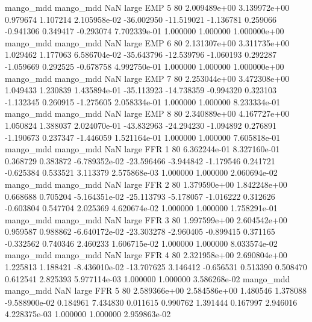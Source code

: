 mango_mdd mango_mdd                   NaN      large      EMP                 5 80 2.009489e+00   3.139972e+00      0.979674       1.107214  2.105958e-02    -36.002950    -11.519021    -1.136781       0.259066 -0.941306   0.349417    -0.293074   7.702339e-01            1.000000        1.000000        1.000000e+00
mango_mdd mango_mdd                   NaN      large      EMP                 6 80 2.131307e+00   3.311735e+00      1.029462       1.177063  6.586704e-02    -35.643796    -12.539796    -1.060193       0.292287 -1.059669   0.292525    -0.678758   4.992750e-01            1.000000        1.000000        1.000000e+00
mango_mdd mango_mdd                   NaN      large      EMP                 7 80 2.253044e+00   3.472308e+00      1.049433       1.230839  1.435894e-01    -35.113923    -14.738359    -0.994320       0.323103 -1.132345   0.260915    -1.275605   2.058334e-01            1.000000        1.000000        8.233334e-01
mango_mdd mango_mdd                   NaN      large      EMP                 8 80 2.340889e+00   4.167727e+00      1.050824       1.388037  2.024070e-01    -43.832963    -24.294230    -1.094892       0.276891 -1.190673   0.237347    -1.446059   1.521164e-01            1.000000        1.000000        7.605818e-01
mango_mdd mango_mdd                   NaN      large      FFR                 1 80 6.362244e-01   8.327160e-01      0.368729       0.383872 -6.789352e-02    -23.596466     -3.944842    -1.179546       0.241721 -0.625384   0.533521     3.113379   2.575868e-03            1.000000        1.000000        2.060694e-02
mango_mdd mango_mdd                   NaN      large      FFR                 2 80 1.379590e+00   1.842248e+00      0.668688       0.705204 -5.164351e-02    -25.113793     -5.178057    -1.016222       0.312626 -0.603804   0.547704     2.025369   4.620674e-02            1.000000        1.000000        1.758291e-01
mango_mdd mango_mdd                   NaN      large      FFR                 3 80 1.997599e+00   2.604542e+00      0.959587       0.988862 -6.640172e-02    -23.303278     -2.960405    -0.899415       0.371165 -0.332562   0.740346     2.460233   1.606715e-02            1.000000        1.000000        8.033574e-02
mango_mdd mango_mdd                   NaN      large      FFR                 4 80 2.321958e+00   2.690804e+00      1.225813       1.188421 -8.436010e-02    -13.707625      3.146412    -0.656531       0.513390  0.508470   0.612541     2.825393   5.977114e-03            1.000000        1.000000        3.586268e-02
mango_mdd mango_mdd                   NaN      large      FFR                 5 80 2.589366e+00   2.584586e+00      1.480546       1.378088 -9.588900e-02      0.184961      7.434830     0.011615       0.990762  1.391444   0.167997     2.946016   4.228375e-03            1.000000        1.000000        2.959863e-02
